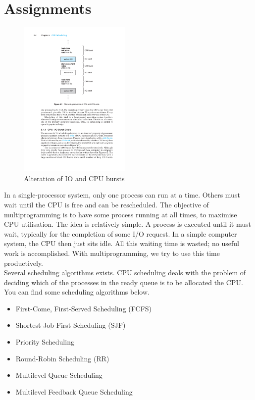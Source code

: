 \section{Assignments}
\begin{figure}
  \vspace{-20pt}
  \begin{center}
    \includegraphics[width=0.48\textwidth]{images/schedule.pdf}
  \end{center}
  \vspace{-20pt}
  \caption{Alteration of IO and CPU bursts}
\end{figure}
In a single-processor system, only one process can run at a time. Others must wait until the CPU is free and can be rescheduled. The objective of multiprogramming is to have some process running at all times, to maximise CPU utilisation. The idea is relatively simple. A process is executed until it must wait, typically for the completion of some I/O request. In a simple computer system, the CPU then just sits idle. All this waiting time is wasted; no useful work is accomplished. With multiprogramming, we try to use this time productively.\\
\vspace{20pt}
Several scheduling algorithms exists. CPU scheduling deals with the problem of deciding which of the processes in the ready queue is to be allocated the CPU. You can find some scheduling algorithms below.
\begin{itemize}
\item First-Come, First-Served Scheduling (FCFS)
\item Shortest-Job-First Scheduling (SJF)
\item Priority Scheduling
\item Round-Robin Scheduling (RR)
\item Multilevel Queue Scheduling
\item Multilevel Feedback Queue Scheduling
\end{itemize}

